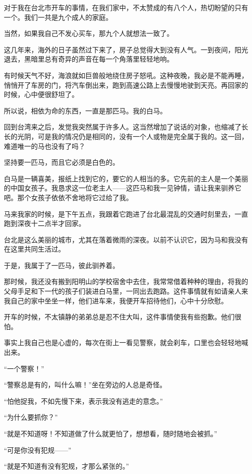\par 对于我在台北市开车的事情，在我们家中，不太赞成的有八个人，热切盼望的只有一个。我们一共是九个成人的家庭。
\par 当然，如果我自己不发心买车，那九个人就想法一致了。
\par 这几年来，海外的日子虽然过下来了，房子总觉得大到没有人气。一到夜间，阳光退去，黑暗里总有奇异的声音在每一个角落里轻轻地响。
\par 有时候天气不好，海浪就如巨兽般地绕住房子怒吼。这种夜晚，我必是不能再睡，悄悄开了车房的门，将汽车倒出来，跑到高速公路上去慢慢地驶到天亮。再回家的时候，心中便很舒坦了。
\par 所以说，相依为命的东西，一直是那匹马。我的白马。
\par 回到台湾来之后，发觉我突然属于许多人。这当然增加了说话的对象，也缩减了长长的光阴，可是我的情况仍是相同的，没有一个人或物是完全属于我的。这一回，难道唯一的马也没有了吗？
\par 坚持要一匹马，而且它必须是白色的。
\par 白马是一辆喜美，报纸上找到它的，要它的人相当的多。它先前的主人是一个美丽的中国女孩子。我恳求这一位老主人——这匹马和我一见钟情，请让我来驯养它吧。那个女孩子依依不舍地将它过给了我。
\par 马来我家的时候，是下午五点，我跟着它跑进了台北最混乱的交通时刻里去，一直跑到深夜十二点半才回家。
\par 台北是这么美丽的城市，尤其在落着微雨的深夜。以前不认识它，因为马和我没有在这里共同生活过。
\par 于是，我属于了一匹马，彼此驯养着。
\par 那时候，我还没有搬到阳明山的学校宿舍中去住，我常常借着种种的理由，将我的父母手足和下一代的孩子们装进白马里，一同出去跑路。这件事情就有如请亲人来我自己的家中坐坐一样，他们进车来，我便开车招待他们，心中十分欣慰。
\par 开车的时候，不太镇静的弟弟总是忍不住大叫，这件事情使我有些抱歉。他们很怕。
\par 事实上我自己也是心虚的，每次在街上一看见警察，就会刹车，口里也会轻轻地喊出来。
\par “一个警察！”
\par “警察总是有的，叫什么嘛！”坐在旁边的人总是奇怪。
\par “怕他捉我，不如先慢下来，表示我没有逃走的意念。”
\par “为什么要抓你？”
\par “就是不知道呀！不知道做了什么就更怕了，想想看，随时随地会被抓。”
\par “可是你没有犯规——”
\par “就是不知道有没有犯规，才那么紧张的。”

